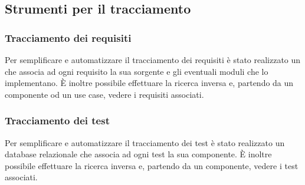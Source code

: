 \subsection{Strumenti per il tracciamento}

\subsubsection{Tracciamento dei requisiti}
\label{}
Per semplificare e automatizzare il tracciamento dei requisiti è stato realizzato un   che associa ad ogni requisito la sua sorgente e gli eventuali moduli che lo implementano. È inoltre possibile effettuare la ricerca inversa e, partendo da un componente od un use case, vedere i requisiti associati.

\subsubsection{Tracciamento dei test}
\label{}
Per semplificare e automatizzare il tracciamento dei test è stato realizzato un database relazionale che associa ad ogni test la sua componente. È inoltre possibile effettuare la ricerca inversa e, partendo da un componente, vedere i test associati.


